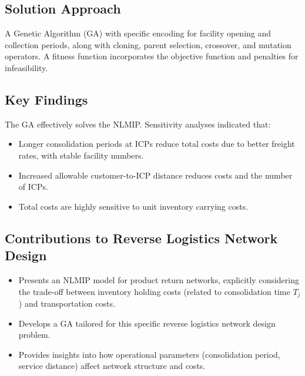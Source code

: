 \subsection*{Solution Approach}
A Genetic Algorithm (GA) with specific encoding for facility opening and collection periods, along with cloning, parent selection, crossover, and mutation operators. A fitness function incorporates the objective function and penalties for infeasibility.

\subsection*{Key Findings}
The GA effectively solves the NLMIP. Sensitivity analyses indicated that:
\begin{itemize}
    \item Longer consolidation periods at ICPs reduce total costs due to better freight rates, with stable facility numbers.
    \item Increased allowable customer-to-ICP distance reduces costs and the number of ICPs.
    \item Total costs are highly sensitive to unit inventory carrying costs.
\end{itemize}

\subsection*{Contributions to Reverse Logistics Network Design}
\begin{itemize}
    \item Presents an NLMIP model for product return networks, explicitly considering the trade-off between inventory holding costs (related to consolidation time $T_j$) and transportation costs.
    \item Develops a GA tailored for this specific reverse logistics network design problem.
    \item Provides insights into how operational parameters (consolidation period, service distance) affect network structure and costs.
\end{itemize}